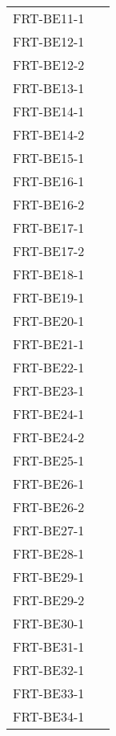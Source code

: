 \documentclass[12pt, titlepage]{article}
\begin{document}
\begin{longtable}{p{} p{}}
	FRT-BE11-1            & ~                \\
	FRT-BE12-1            & ~                \\
	FRT-BE12-2            & ~                \\
	FRT-BE13-1            & ~                \\
	FRT-BE14-1            & ~                \\
	FRT-BE14-2            & ~                \\
	FRT-BE15-1            & ~                \\
	FRT-BE16-1            & ~                \\
	FRT-BE16-2            & ~                \\
	FRT-BE17-1            & ~                \\
	FRT-BE17-2            & ~                \\
	FRT-BE18-1            & ~                \\
	FRT-BE19-1            & ~                \\
	FRT-BE20-1            & ~                \\
	FRT-BE21-1            & ~                \\
	FRT-BE22-1            & ~                \\
	FRT-BE23-1            & ~                \\
	FRT-BE24-1            & ~                \\
	FRT-BE24-2            & ~                \\
	FRT-BE25-1            & ~                \\
	FRT-BE26-1            & ~                \\
	FRT-BE26-2            & ~                \\
	FRT-BE27-1            & ~                \\
	FRT-BE28-1            & ~                \\
	FRT-BE29-1            & ~                \\
	FRT-BE29-2            & ~                \\
	FRT-BE30-1            & ~                \\
	FRT-BE31-1            & ~                \\
	FRT-BE32-1            & ~                \\
	FRT-BE33-1            & ~                \\
	FRT-BE34-1            & ~                \\

\end{longtable}
\end{document}
